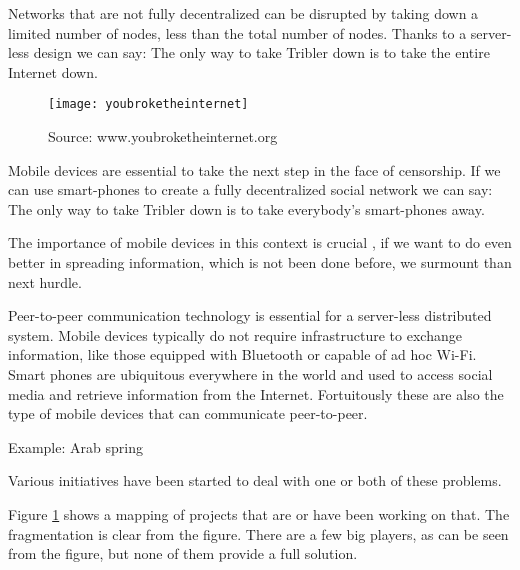 Networks that are not fully decentralized can be disrupted by taking down a limited number of nodes, less than the total number of nodes.
Thanks to a server-less design we can say:
The only way to take Tribler down is to take the entire Internet down.

\begin{figure}[H]
	\centering
	\texttt{[image: youbroketheinternet]}
	\caption{Source: www.youbroketheinternet.org}
	\label{fig:youbroketheinternet}
\end{figure}

Mobile devices are essential to take the next step in the face of censorship.
If we can use smart-phones to create a fully decentralized social network we can say:
The only way to take Tribler down is to take everybody's smart-phones away.

The importance of mobile devices in this context is crucial , if we want to do even better in spreading information, which is not been done before, we surmount than next hurdle.

Peer-to-peer communication technology is essential for a server-less distributed system.
Mobile devices typically do not require infrastructure to exchange information, like those equipped with Bluetooth or capable of ad hoc Wi-Fi.
Smart phones are ubiquitous everywhere in the world and used to access social media and retrieve information from the Internet.
Fortuitously these are also the type of mobile devices that can communicate peer-to-peer.

Example: Arab spring \cite{Johan_2001}


Various initiatives have been started to deal with one or both of these problems. \cite{re_decentralize}

Figure \ref{fig:youbroketheinternet} shows a mapping of projects that are or have been working on that.
The fragmentation is clear from the figure.
There are a few big players, as can be seen from the figure, but none of them provide a full solution.




